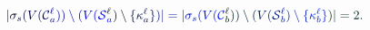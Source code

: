 \documentclass[12pt]{article}
\begin{document}
\makeatletter
\renewcommand*{\@textcolor}[3]{%
  \protect\leavevmode
  \begingroup
    \color#1{#2}#3%
  \endgroup
}
\makeatother
\begin{displaymath}
\mathcolor[RGB]{0,0,15}{|} \mathcolor[RGB]{0,0,30}{\sigma} _ { \mathcolor[RGB]{0,0,45}{s} } \mathcolor[RGB]{0,0,60}{(} \mathcolor[RGB]{0,0,75}{V} \mathcolor[RGB]{0,0,90}{(} \mathcal { \mathcolor[RGB]{0,0,105}{C} } _ { \mathcolor[RGB]{0,0,120}{a} } ^ { \mathcolor[RGB]{0,0,135}{\ell} } \mathcolor[RGB]{0,0,150}{)} \mathcolor[RGB]{0,0,165}{)} \mathcolor[RGB]{0,0,180}{\setminus} \mathcolor[RGB]{0,0,195}{(} \mathcolor[RGB]{0,0,210}{V} \mathcolor[RGB]{0,0,225}{(} \mathcal { \mathcolor[RGB]{0,0,240}{S} } _ { \mathcolor[RGB]{0,0,255}{a} } ^ { \mathcolor[RGB]{0,15,0}{\ell} } \mathcolor[RGB]{0,15,15}{)} \mathcolor[RGB]{0,15,30}{\setminus} \mathcolor[RGB]{0,15,45}{\{} \mathcolor[RGB]{0,15,60}{\kappa} _ { \mathcolor[RGB]{0,15,75}{a} } ^ { \mathcolor[RGB]{0,15,90}{\ell} } \mathcolor[RGB]{0,15,105}{\}} \mathcolor[RGB]{0,15,120}{)} \mathcolor[RGB]{0,15,135}{|} \mathcolor[RGB]{0,15,150}{=} \mathcolor[RGB]{0,15,165}{|} \mathcolor[RGB]{0,15,180}{\sigma} _ { \mathcolor[RGB]{0,15,195}{s} } \mathcolor[RGB]{0,15,210}{(} \mathcolor[RGB]{0,15,225}{V} \mathcolor[RGB]{0,15,240}{(} \mathcal { \mathcolor[RGB]{0,15,255}{C} } _ { \mathcolor[RGB]{0,30,0}{b} } ^ { \mathcolor[RGB]{0,30,15}{\ell} } \mathcolor[RGB]{0,30,30}{)} \mathcolor[RGB]{0,30,45}{)} \mathcolor[RGB]{0,30,60}{\setminus} \mathcolor[RGB]{0,30,75}{(} \mathcolor[RGB]{0,30,90}{V} \mathcolor[RGB]{0,30,105}{(} \mathcal { \mathcolor[RGB]{0,30,120}{S} } _ { \mathcolor[RGB]{0,30,135}{b} } ^ { \mathcolor[RGB]{0,30,150}{\ell} } \mathcolor[RGB]{0,30,165}{)} \mathcolor[RGB]{0,30,180}{\setminus} \mathcolor[RGB]{0,30,195}{\{} \mathcolor[RGB]{0,30,210}{\kappa} _ { \mathcolor[RGB]{0,30,225}{b} } ^ { \mathcolor[RGB]{0,30,240}{\ell} } \mathcolor[RGB]{0,30,255}{\}} \mathcolor[RGB]{0,45,0}{)} \mathcolor[RGB]{0,45,15}{|} \mathcolor[RGB]{0,45,30}{=} \mathcolor[RGB]{0,45,45}{2} \mathcolor[RGB]{0,45,60}{.}
\end{displaymath}
\end{document}
